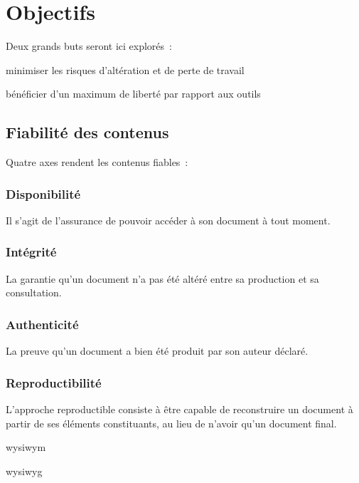 \section{Objectifs}

Deux grands buts seront ici explorés :
\begin{itmz}
\item{minimiser les risques d’altération et de perte de travail}
\item{bénéficier d’un maximum de liberté par rapport aux outils}
\end{itmz}
\subsection{Fiabilité des contenus}

Quatre axes rendent les contenus fiables :

\subsubsection{Disponibilité}

Il s’agit de l’assurance de pouvoir accéder à son document à tout moment.

\subsubsection{Intégrité}

La garantie qu’un document n’a pas été altéré
entre sa production et sa consultation.

\subsubsection{Authenticité}

La preuve qu’un document a bien été produit par son auteur déclaré.

\subsubsection{Reproductibilité}

L’approche reproductible consiste à être capable de reconstruire un document
à partir de ses éléments constituants, au lieu de n’avoir qu’un document final.

\begin{itmz}
\item{\gls{wysiwym} \cite{wysiwym}}
\item{\gls{wysiwyg} \cite{wysiwyg}}
\end{itmz}
